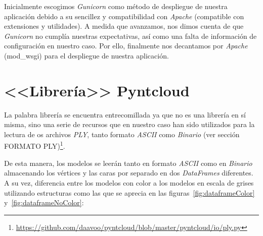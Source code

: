 Inicialmente escogimos \textit{Gunicorn} como método de despliegue de nuestra aplicación debido a su sencillez y compatibilidad con \textit{Apache} (compatible con extensiones y utilidades). A medida que avanzamos, nos dimos cuenta de que \textit{Gunicorn} no cumplía nuestras expectativas, así como una falta de información de configuración en nuestro caso. Por ello, finalmente nos decantamos por \textit{Apache} (mod\_wsgi) para el despliegue de nuestra aplicación.

\section{<<Librería>> Pyntcloud}
La palabra librería se encuentra entrecomillada ya que no es una librería en sí misma, sino una serie de recursos que en nuestro caso han sido utilizados para la lectura de os archivos \textit{PLY}, tanto formato \textit{ASCII} como \textit{Binario} (ver sección FORMATO PLY)\footnote{\url{https://github.com/daavoo/pyntcloud/blob/master/pyntcloud/io/ply.py}}.

De esta manera, los modelos se leerán tanto en formato \textit{ASCII} como en \textit{Binario} almacenando los vértices y las caras por separado en dos \textit{DataFrames} diferentes. A su vez, diferencia entre los modelos con color a los modelos en escala de grises utilizando estructuras como las que se aprecia en las figuras~\ref{fig:dataframeColor} y~\ref{fig:dataframeNoColor}:
